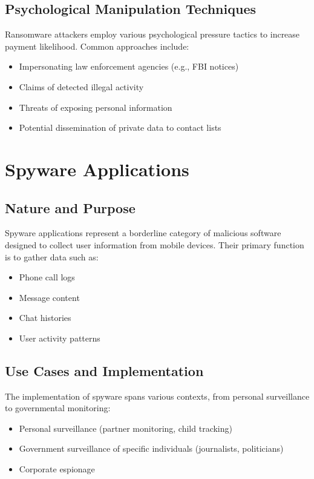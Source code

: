 \documentclass{article}
\begin{document}
\subsection{Psychological Manipulation Techniques}
Ransomware attackers employ various psychological pressure tactics to increase payment likelihood. Common approaches include:
\begin{itemize}
    \item Impersonating law enforcement agencies (e.g., FBI notices)
    \item Claims of detected illegal activity
    \item Threats of exposing personal information
    \item Potential dissemination of private data to contact lists
\end{itemize}

\section{Spyware Applications}
\subsection{Nature and Purpose}
Spyware applications represent a borderline category of malicious software designed to collect user information from mobile devices. Their primary function is to gather data such as:
\begin{itemize}
    \item Phone call logs
    \item Message content
    \item Chat histories
    \item User activity patterns
\end{itemize}

\subsection{Use Cases and Implementation}
The implementation of spyware spans various contexts, from personal surveillance to governmental monitoring:
\begin{itemize}
    \item Personal surveillance (partner monitoring, child tracking)
    \item Government surveillance of specific individuals (journalists, politicians)
    \item Corporate espionage
\end{itemize}
\end{document}
